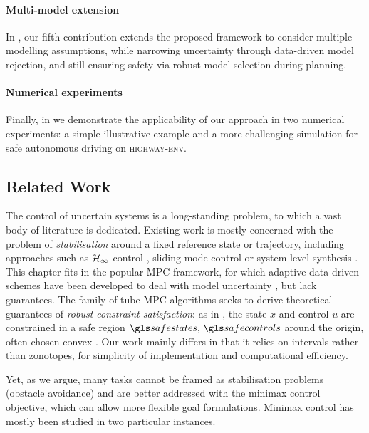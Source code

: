 \paragraph{Multi-model extension}
In \textbf{}, our fifth contribution extends the proposed framework to consider multiple modelling assumptions, while narrowing uncertainty through data-driven model rejection, and still ensuring safety via robust model-selection during planning.

\paragraph{Numerical experiments}
Finally, in \textbf{} we demonstrate the applicability of our approach in two numerical experiments: a simple illustrative example and a more challenging simulation for safe autonomous driving on \textsc{highway-env}.

\subsection{Related Work}

The control of uncertain systems is a long-standing problem, to which a vast body of literature is dedicated. Existing work is mostly concerned with the problem of \emph{stabilisation} around a fixed reference state or trajectory, including approaches such as $\mathcal{H}_\infty$ control \citep[][]{Basar1996}, sliding-mode control \citep{Lu1997} or system-level synthesis \citep{Dean2019,Dean2018}. This chapter fits in the popular \gls{MPC} framework, for which adaptive data-driven schemes have been developed to deal with model uncertainty \citep{Sastry1990,Tanaskovic2014,Amos2018}, but lack guarantees. The family of tube-MPC algorithms seeks to derive theoretical guarantees of \emph{robust constraint satisfaction}: as in , the state $x$ and control $u$ are constrained in a safe region $\safestates,\,\safecontrols$ around the origin, often chosen convex \citep{Fukushima2007,Adetola2009,Aswani2013,Turchetta2016,Lorenzen2017,Kohler2019,Lu2019}. Our work mainly differs in that it relies on intervals rather than zonotopes, for simplicity of implementation and computational efficiency.

Yet, as we argue, many tasks cannot be framed as stabilisation problems (\eg obstacle avoidance) and are better addressed with the minimax control objective, which can allow more flexible goal formulations. Minimax control has mostly been studied in two particular instances.

